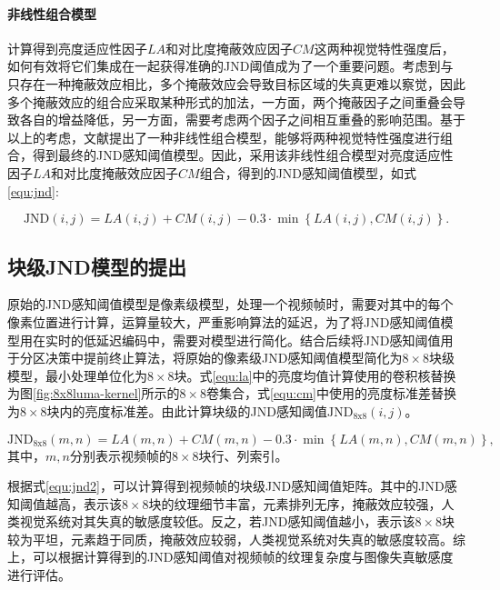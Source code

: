   \paragraph{非线性组合模型} 计算得到亮度适应性因子$LA$和对比度掩蔽效应因子$CM$这两种视觉特性强度后，如何有效将它们集成在一起获得准确的JND阈值成为了一个重要问题。考虑到与只存在一种掩蔽效应相比，多个掩蔽效应会导致目标区域的失真更难以察觉，因此多个掩蔽效应的组合应采取某种形式的加法，一方面，两个掩蔽因子之间重叠会导致各自的增益降低，另一方面，需要考虑两个因子之间相互重叠的影响范围。基于以上的考虑，文献\cite{yangJustNoticeableDistortion2005}提出了一种非线性组合模型，能够将两种视觉特性强度进行组合，得到最终的JND感知阈值模型。因此，采用该非线性组合模型对亮度适应性因子$LA$和对比度掩蔽效应因子$CM$组合，得到的JND感知阈值模型，如式\ref{equ:jnd}:

  \begin{equation} \label{equ:jnd}
    \mathrm{JND}(i, j) = LA(i, j) + CM(i, j) - 0.3 \cdot \min \left\{LA(i, j) , CM(i, j)\right\}.
  \end{equation}



	\subsection{块级JND模型的提出\label{sec:blk-based-jnd}}
	原始的JND感知阈值模型是像素级模型，处理一个视频帧时，需要对其中的每个像素位置进行计算，运算量较大，严重影响算法的延迟，为了将JND感知阈值模型用在实时的低延迟编码中，需要对模型进行简化。结合后续将JND感知阈值用于分区决策中提前终止算法，将原始的像素级JND感知阈值模型简化为$8\times 8$块级模型，最小处理单位化为$8\times 8$块。式\ref{equ:la}中的亮度均值计算使用的卷积核替换为图\ref{fig:8x8luma-kernel}所示的$8\times 8$卷集合，式\ref{equ:cm}中使用的亮度标准差替换为$8\times 8$块内的亮度标准差。由此计算块级的JND感知阈值$\mathrm{JND_{8x8}}(i, j)$。

	\begin{equation} \label{equ:jnd2}
		\mathrm{JND_{8x8}}(m, n) = LA(m, n) + CM(m, n) - 0.3 \cdot \min \left\{LA(m, n) , CM(m, n)\right\},
	\end{equation}
	其中，$m, n$分别表示视频帧的$8\times 8$块行、列索引。

  根据式\ref{equ:jnd2}，可以计算得到视频帧的块级JND感知阈值矩阵。其中的JND感知阈值越高，表示该$8\times 8$块的纹理细节丰富，元素排列无序，掩蔽效应较强，人类视觉系统对其失真的敏感度较低。反之，若JND感知阈值越小，表示该$8\times 8$块较为平坦，元素趋于同质，掩蔽效应较弱，人类视觉系统对失真的敏感度较高。综上，可以根据计算得到的JND感知阈值对视频帧的纹理复杂度与图像失真敏感度进行评估。

